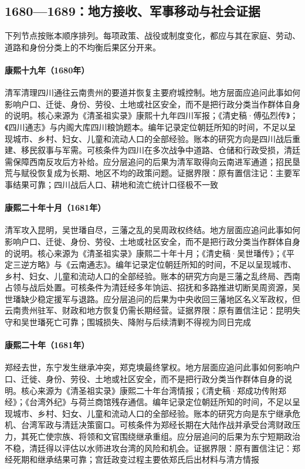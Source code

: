 \subsection{1680—1689：地方接收、军事移动与社会证据}
下列节点按账本顺序排列。每项政策、战役或制度变化，都应与其在家庭、劳动、道路和身份分类上的不均衡后果区分开来。
\hypertarget{social:EQ-1680-SICHUAN-RECOVERY}{}\paragraph{康熙十九年（1680年）}清军清理四川通往云南贵州的要道并恢复主要府城控制。地方层面应追问此事如何影响户口、迁徙、身份、劳役、土地或社区安全，而不是把行政分类当作群体自身的说明。核心来源为《清圣祖实录》康熙十九年四川军报；《清史稿·傅弘烈传》；《四川通志》与内阁大库四川粮饷题本。编年记录定位朝廷所知的时间，不足以呈现城市、乡村、妇女、儿童和流动人口的全部经验。账本的研究方向是四川战后重建、移民叙事与军需。可核条件为四川在多次战争中道路、仓储和行政受损，清廷需保障西南反攻后方补给。应分层追问的后果为清军取得向云南进军通道；招民垦荒与赋役恢复成为长期、地区不均的政策问题。证据界限：原有置信注记：主要军事结果可靠；四川战后人口、耕地和流亡统计口径极不一致
\hypertarget{social:EQ-1681-KUNMING}{}\paragraph{康熙二十年十月（1681年）}清军攻入昆明，吴世璠自尽，三藩之乱的吴周政权终结。地方层面应追问此事如何影响户口、迁徙、身份、劳役、土地或社区安全，而不是把行政分类当作群体自身的说明。核心来源为《清圣祖实录》康熙二十年十月；《清史稿·吴世璠传》；《平定三逆方略》与《云南通志》。编年记录定位朝廷所知的时间，不足以呈现城市、乡村、妇女、儿童和流动人口的全部经验。账本的研究方向是三藩之乱终局、西南占领与战后处置。可核条件为清廷经多年饷运、招抚和多路推进切断吴周资源，吴世璠缺少稳定援军与退路。应分层追问的后果为中央收回三藩地区名义军政权，但云南贵州驻军、财政和地方恢复仍需长期经营。证据界限：原有置信注记：昆明失守和吴世璠死亡可靠；围城损失、降附与后续清剿不得视为同日完成
\hypertarget{social:EQ-1681-ZHENG-JING-DEATH}{}\paragraph{康熙二十年（1681年）}郑经去世，东宁发生继承冲突，郑克塽最终掌权。地方层面应追问此事如何影响户口、迁徙、身份、劳役、土地或社区安全，而不是把行政分类当作群体自身的说明。核心来源为《清圣祖实录》康熙二十年台湾情报；《清史稿·郑成功传附郑经》；《台湾外纪》与荷兰商馆残存通信。编年记录定位朝廷所知的时间，不足以呈现城市、乡村、妇女、儿童和流动人口的全部经验。账本的研究方向是东宁继承危机、台湾军政与清廷决策窗口。可核条件为郑经长期在大陆作战并承受台湾财政压力，其死亡使宗族、将领和文官围绕继承重组。应分层追问的后果为东宁短期政治不稳，清廷得以评估以水师进攻台湾的风险和机会。证据界限：原有置信注记：郑经死期和继承结果可靠；宫廷政变过程主要依郑氏后出材料与清方情报
